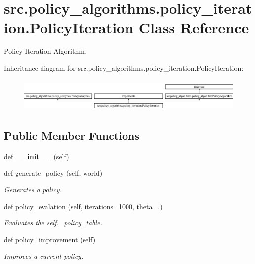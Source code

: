\hypertarget{classsrc_1_1policy__algorithms_1_1policy__iteration_1_1_policy_iteration}{}\section{src.\+policy\+\_\+algorithms.\+policy\+\_\+iteration.\+Policy\+Iteration Class Reference}
\label{classsrc_1_1policy__algorithms_1_1policy__iteration_1_1_policy_iteration}


Policy Iteration Algorithm.  


Inheritance diagram for src.\+policy\+\_\+algorithms.\+policy\+\_\+iteration.\+Policy\+Iteration\+:\begin{figure}[H]
\begin{center}
\leavevmode
\includegraphics[height=1.707317cm]{classsrc_1_1policy__algorithms_1_1policy__iteration_1_1_policy_iteration}
\end{center}
\end{figure}
\subsection*{Public Member Functions}
\begin{DoxyCompactItemize}
\item 
\mbox{\label{classsrc_1_1policy__algorithms_1_1policy__iteration_1_1_policy_iteration_a3ea5779f89b73dc7a4ed60bb28aa38d8}} 
def {\bfseries \+\_\+\+\_\+init\+\_\+\+\_\+} (self)
\item 
def \hyperlink{classsrc_1_1policy__algorithms_1_1policy__iteration_1_1_policy_iteration_a7ee703e2982604f37990128d183e5422}{generate\+\_\+policy} (self, world)
\begin{DoxyCompactList}\small\item\em Generates a policy. \end{DoxyCompactList}\item 
def \hyperlink{classsrc_1_1policy__algorithms_1_1policy__iteration_1_1_policy_iteration_aac6bf2e59dc9bd9859bcfe5008fe45dd}{policy\+\_\+evalation} (self, iterations=1000, theta=.)
\begin{DoxyCompactList}\small\item\em Evaluates the self.\+\_\+policy\+\_\+table. \end{DoxyCompactList}\item 
def \hyperlink{classsrc_1_1policy__algorithms_1_1policy__iteration_1_1_policy_iteration_a8ab119a11521c5adc06f05e7fa0b34e4}{policy\+\_\+improvement} (self)
\begin{DoxyCompactList}\small\item\em Improves a current policy. \end{DoxyCompactList}\end{DoxyCompactItemize}
